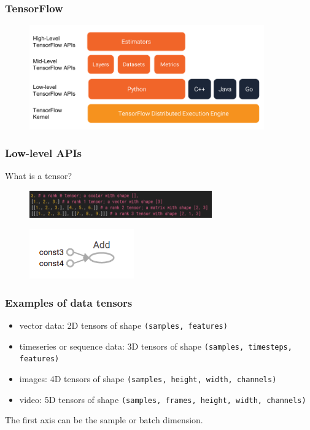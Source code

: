 \begin{frame}
        \frametitle{TensorFlow}

        \begin{figure}
                \includegraphics[width=0.9\textwidth]{Pics/tf_api.png}
        \end{figure}

\end{frame}

\begin{frame}
        \frametitle{Low-level APIs}

	What is a tensor?

        \begin{figure}
                \includegraphics[width=0.7\textwidth]{Pics/tensor.png}
        \end{figure}

	\begin{figure}
                \includegraphics[width=0.4\textwidth]{Pics/graph.png}
        \end{figure}

\end{frame}

\begin{frame}
	\frametitle{Examples of data tensors}

	\begin{itemize}
		\item vector data: 2D tensors of shape \texttt{(samples, features)}
		\item timeseries or sequence data: 3D tensors of shape \texttt{(samples, timesteps, features)}
		\item images: 4D tensors of shape \texttt{(samples, height, width, channels)}
		\item video: 5D tensors of shape \texttt{(samples, frames, height, width, channels)}
	\end{itemize}

	\small{The first axis can be the sample or batch dimension.}

\end{frame}

